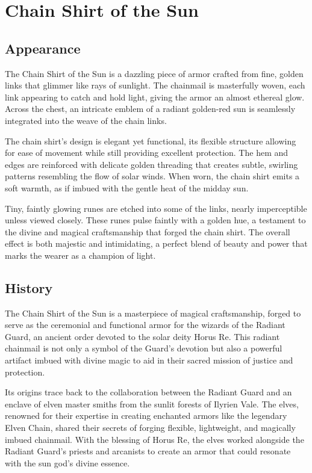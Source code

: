 
\chapter*{Chain Shirt of the Sun}
\section*{Appearance}
The Chain Shirt of the Sun is a dazzling piece of armor crafted from fine, golden links that glimmer like rays of sunlight. The chainmail is masterfully woven, each link appearing to catch and hold light, giving the armor an almost ethereal glow. Across the chest, an intricate emblem of a radiant golden-red sun is seamlessly integrated into the weave of the chain links.

The chain shirt's design is elegant yet functional, its flexible structure allowing for ease of movement while still providing excellent protection. The hem and edges are reinforced with delicate golden threading that creates subtle, swirling patterns resembling the flow of solar winds. When worn, the chain shirt emits a soft warmth, as if imbued with the gentle heat of the midday sun.

Tiny, faintly glowing runes are etched into some of the links, nearly imperceptible unless viewed closely. These runes pulse faintly with a golden hue, a testament to the divine and magical craftsmanship that forged the chain shirt. The overall effect is both majestic and intimidating, a perfect blend of beauty and power that marks the wearer as a champion of light.

\vfill\eject
\section*{History}
The Chain Shirt of the Sun is a masterpiece of magical craftsmanship, forged to serve as the ceremonial and functional armor for the wizards of the Radiant Guard, an ancient order devoted to the solar deity Horus Re. This radiant chainmail is not only a symbol of the Guard's devotion but also a powerful artifact imbued with divine magic to aid in their sacred mission of justice and protection.

Its origins trace back to the collaboration between the Radiant Guard and an enclave of elven master smiths from the sunlit forests of Ilyrien Vale. The elves, renowned for their expertise in creating enchanted armors like the legendary Elven Chain, shared their secrets of forging flexible, lightweight, and magically imbued chainmail. With the blessing of Horus Re, the elves worked alongside the Radiant Guard's priests and arcanists to create an armor that could resonate with the sun god's divine essence.

